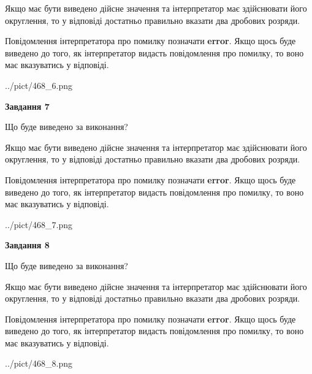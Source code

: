 \documentclass[12pt, ukrainian]{article}
\begin{document}
{\begin {Large}
Якщо має бути виведено дійсне значення та інтерпретатор має здійснювати його округлення, 
то у відповіді достатньо правильно вказати два дробових розряди.

Повідомлення інтерпретатора про помилку позначати \textbf{error}.
Якщо щось буде виведено до того, як інтерпретатор видасть повідомлення про помилку, 
то воно має вказуватись у відповіді. \par

\begin{center}
	{../pict/468_6.png}
\end{center}
\newpage

{\begin {center}\textbf{Завдання 7}\end {center}}\par
Що буде виведено за виконання? \par

Якщо має бути виведено дійсне значення та інтерпретатор має здійснювати його округлення, 
то у відповіді достатньо правильно вказати два дробових розряди.

Повідомлення інтерпретатора про помилку позначати \textbf{error}.
Якщо щось буде виведено до того, як інтерпретатор видасть повідомлення про помилку, 
то воно має вказуватись у відповіді. \par

\begin{center}
	{../pict/468_7.png}
\end{center}
\newpage

{\begin {center}\textbf{Завдання 8}\end {center}}\par
Що буде виведено за виконання? \par

Якщо має бути виведено дійсне значення та інтерпретатор має здійснювати його округлення, 
то у відповіді достатньо правильно вказати два дробових розряди.

Повідомлення інтерпретатора про помилку позначати \textbf{error}.
Якщо щось буде виведено до того, як інтерпретатор видасть повідомлення про помилку, 
то воно має вказуватись у відповіді. \par

\begin{center}
	{../pict/468_8.png}
\end{center}
\newpage


\end{Large}}
\end{document}

